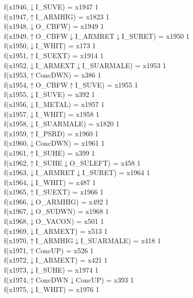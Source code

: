 f(x1946,$\downarrow$I\_SUVE) = x1947 {1} \\
f(x1947,$\uparrow$I\_ARMHIG) = x1823 {1} \\
f(x1948,$\downarrow$O\_CBFW) = x1949 {1} \\
f(x1949,$\uparrow$O\_CBFW$\downarrow$I\_ARMRET$\downarrow$I\_SURET) = x1950 {1} \\
f(x1950,$\downarrow$I\_WHIT) = x173 {1} \\
f(x1951,$\uparrow$I\_SUEXT) = x1914 {1} \\
f(x1952,$\downarrow$I\_ARMEXT$\downarrow$I\_SUARMALE) = x1953 {1} \\
f(x1953,$\uparrow$ConcDWN) = x386 {1} \\
f(x1954,$\uparrow$O\_CBFW$\uparrow$I\_SUVE) = x1955 {1} \\
f(x1955,$\downarrow$I\_SUVE) = x392 {1} \\
f(x1956,$\downarrow$I\_METAL) = x1957 {1} \\
f(x1957,$\downarrow$I\_WHIT) = x1958 {1} \\
f(x1958,$\downarrow$I\_SUARMALE) = x1820 {1} \\
f(x1959,$\uparrow$I\_PSRD) = x1960 {1} \\
f(x1960,$\downarrow$ConcDWN) = x1961 {1} \\
f(x1961,$\uparrow$I\_SUHE) = x399 {1} \\
f(x1962,$\uparrow$I\_SUHE$\downarrow$O\_SULEFT) = x458 {1} \\
f(x1963,$\downarrow$I\_ARMRET$\downarrow$I\_SURET) = x1964 {1} \\
f(x1964,$\downarrow$I\_WHIT) = x487 {1} \\
f(x1965,$\uparrow$I\_SUEXT) = x1966 {1} \\
f(x1966,$\downarrow$O\_ARMHIG) = x492 {1} \\
f(x1967,$\downarrow$O\_SUDWN) = x1968 {1} \\
f(x1968,$\downarrow$O\_VACON) = x501 {1} \\
f(x1969,$\downarrow$I\_ARMEXT) = x513 {1} \\
f(x1970,$\uparrow$I\_ARMHIG$\downarrow$I\_SUARMALE) = x418 {1} \\
f(x1971,$\uparrow$ConcUP) = x526 {1} \\
f(x1972,$\downarrow$I\_ARMEXT) = x421 {1} \\
f(x1973,$\downarrow$I\_SUHE) = x1974 {1} \\
f(x1974,$\uparrow$ConcDWN$\downarrow$ConcUP) = x393 {1} \\
f(x1975,$\downarrow$I\_WHIT) = x1976 {1} \\
